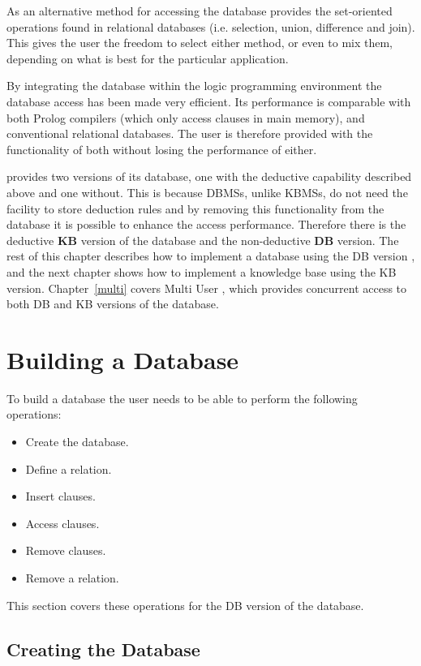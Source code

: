As an alternative method for accessing the database \eclipse provides the 
set-oriented operations found in relational databases (i.e. selection,
union, difference and join). 
This gives the user the
freedom to select either method, or even to mix them, depending on what
is best for the particular application.

By integrating the database within the logic programming environment
the database access has been made very efficient.  Its performance
is comparable with both Prolog compilers (which only access clauses in main memory),
and conventional relational databases.  The user is therefore provided 
with the functionality of both without losing the performance of either.

\eclipse provides two versions of its database, one with the deductive
capability described above and one without.  This is because DBMSs, unlike
KBMSs, do not need the facility to store deduction rules
and by removing this functionality from the database it is possible to 
enhance the access performance. Therefore there is the deductive {\bf KB} version
of the database and the non-deductive
{\bf DB} version.
The rest of this chapter describes how to implement a database using the DB version
, and the next chapter shows how to implement a knowledge base using the 
KB version.  Chapter~\ref{multi} covers Multi User \eclipse, which 
provides concurrent access to both DB and KB versions of the database.

\newpage
\section{Building a Database}

To build a database the user needs to be
able to perform the following operations:

\begin{itemize}
\item Create the database.
\item Define a relation.
\item Insert clauses.
\item Access clauses. 
\item Remove clauses.
\item Remove a relation.
\end{itemize}
This section covers these operations for the DB version of the \eclipse database.

\subsection{Creating the Database}
\label{create}

